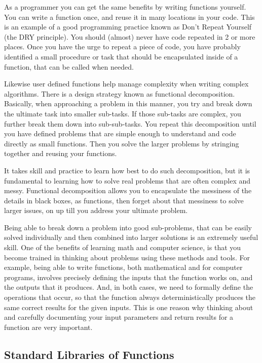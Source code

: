 \documentclass[11pt]{article}
\begin{document}
As a programmer you can get the same benefits by writing functions
yourself.  You can write a function once, and reuse it in many
locations in your code.  This is an example of a good programming
practice known as Don't Repeat Yourself (the DRY principle).  You
should (almost) never have code repeated in 2 or more places.  Once
you have the urge to repeat a piece of code, you have probably
identified a small procedure or task that should be encapsulated
inside of a function, that can be called when needed.

Likewise user defined functions help manage complexity when writing
complex algorithms.  There is a design strategy known as functional
decomposition.  Basically, when approaching a problem in this manner,
you try and break down the ultimate task into smaller sub-tasks.  If
those sub-tasks are complex, you further break them down into
sub-sub-tasks.  You repeat this decomposition until you have defined
problems that are simple enough to understand and code directly as
small functions.  Then you solve the larger problems by stringing
together and reusing your functions.

It takes skill and practice to learn how best to do such
decomposition, but it is fundamental to learning how to solve real
problems that are often complex and messy.  Functional decomposition
allows you to encapsulate the messiness of the details in black boxes,
as functions, then forget about that messiness to solve larger issues,
on up till you address your ultimate problem.

Being able to break down a problem into good sub-problems, that can be
easily solved individually and then combined into larger solutions is
an extremely useful skill.  One of the benefits of learning math and
computer science, is that you become trained in thinking about
problems using these methods and tools.  For example, being able to
write functions, both mathematical and for computer programs, involves
precisely defining the inputs that the function works on, and the
outputs that it produces.  And, in both cases, we need to formally
define the operations that occur, so that the function always
deterministically produces the same correct results for the given
inputs.  This is one reason why thinking about and carefully
documenting your input parameters and return results for a function
are very important.
\subsection{Standard Libraries of Functions}
\label{sec-1-2}
\end{document}
